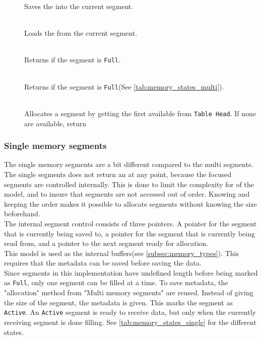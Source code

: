 \begin{description}
  \item[{}]\hfill

  Saves the  into the current segment.

  \item[]\hfill\\
  Loads the  from the current segment.

  \item[]\hfill\\
  Returns if the segment is \texttt{Full}.

  \item[]\hfill\\
  Returns if the segment is \texttt{Full}(See \autoref{tab:memory_states_multi}).

  \item[]\hfill\\
  Allocates a segment by getting the first available from \texttt{Table Head}.
  If none are available, return
\end{description}




\subsubsection{Single memory segments}
The single memory segments are a bit different compared to the multi segments.
The single segments does not return an  at any point,
because the focused segments are controlled internally. This is done to limit
the complexity for of the model, and to insure that segments are not accessed
out of order. Knowing and keeping the order makes it possible to allocate
segments without knowing the size beforehand.\\
The internal segment control
consists of three pointers. A pointer for the segment that is currently being
saved to, a pointer for the segment that is currently being read from, and
a pointer to the next segment ready for allocation.\\
This model is used as the internal buffers(see \autoref{subsec:memory_types}).
This requires that the metadata can be saved before saving the data.\\
Since segments in this implementation have undefined length before being marked
as \texttt{Full}, only one segment can be filled at a time. To save metadata,
the "allocation" method from "Multi memory segments" are reused. Instead
of giving the size of the segment, the metadata is given. This marks the segment
as \texttt{Active}. An \texttt{Active} segment is ready to receive data, but only
when the currently receiving segment is done filling. See
\autoref{tab:memory_states_single} for the different states.\\

